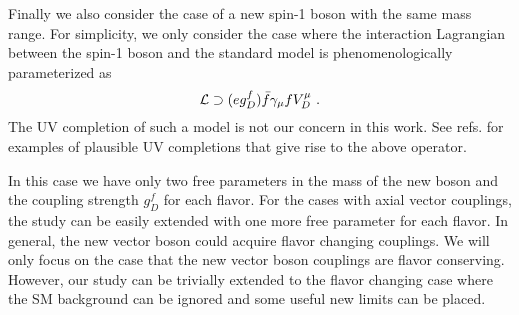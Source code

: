 \documentclass[11pt]{article}
\begin{document}
Finally we also consider the case of a new spin-1 boson with the same mass range.
For simplicity, we only consider the case where the interaction Lagrangian between the spin-1 boson and the standard model  is phenomenologically parameterized  as
\begin{equation}
{\cal L} \supset (e g_D^f)\bar{f}\gamma_\mu f V_D^\mu
     \ .
\end{equation}
The UV completion of such a model is not our concern in this work. See refs. \cite{Chang:2006fp,Chang:2007ki} for examples of plausible UV completions that give rise to the above operator. \par
In this case we have only two free parameters in the mass of the new boson and the coupling strength $g_D^f$  for each flavor.   For the cases with axial vector couplings, the study can be easily extended with one more free parameter for each flavor.
In general, the new vector boson could acquire flavor changing couplings.  We will only focus on the case that the new vector boson couplings are  flavor conserving.
However, our study can be trivially extended to the flavor changing case where the SM background can be ignored and some useful new limits can be placed.
\end{document}
